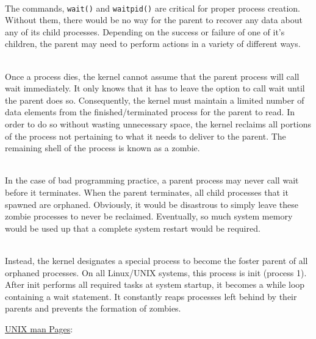 \documentclass[12pt]{extarticle}
\newenvironment{myindentpar}[1]%
 {\begin{list}{}%
         {\setlength{\leftmargin}{#1}}%
         \item[]%
 }
 {\end{list}}
\newcommand{\code}[1]{\colorbox{codegray}{\texttt{#1}}}
\begin{document}
\begin{myindentpar}{5mm}
    \ \\
    The commands, \code{wait()} and \code{waitpid()} are critical for proper process creation.  Without them, there would be no way for the parent to recover any data about any of its child processes.  Depending on the success or failure of one of it's children, the parent may need to perform actions in a variety of different ways.  
    
    \ \\
    Once a process dies, the kernel cannot assume that the parent process will call wait immediately.  It only knows that it has to leave the option to call wait until the parent does so.  Consequently, the kernel must maintain a limited number of data elements from the finished/terminated process for the parent to read.  In order to do so without wasting unnecessary space, the kernel reclaims all portions of the process not pertaining to what it needs to deliver to the parent.  The remaining shell of the process is known as a zombie.  
    
    \ \\
    In the case of bad programming practice, a parent process may never call wait before it terminates.  When the parent terminates, all child processes that it spawned are orphaned.  Obviously, it would be disastrous to simply leave these zombie processes to never be reclaimed.  Eventually, so much system memory would be used up that a complete system restart would be required.  
    
    \ \\
    Instead, the kernel designates a special process to become the foster parent of all orphaned processes.  On all Linux/UNIX systems, this process is init (process 1).  After init performs all required tasks at system startup, it becomes a while loop containing a wait statement.  It constantly reaps processes left behind by their parents and prevents the formation of zombies.  
    
\end{myindentpar}

\newpage
\noindent
{\large \underline{UNIX man Pages}:}
\end{document}
